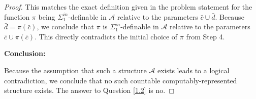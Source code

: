 \begin{proof}
This matches the exact definition given in the problem statement for the function $\pi$ being $\Sigma^{in}_1$-definable in $\mathcal{A}$ relative to the parameters $\bar{c} \cup \bar{d}$. 
Because $\bar{d} = \pi(\bar{c})$, we conclude that $\pi$ is $\Sigma^{in}_1$-definable in $\mathcal{A}$ relative to the parameters $\bar{c} \cup \pi(\bar{c})$. 
This directly contradicts the initial choice of $\pi$ from Step 4. 

\textbf{Conclusion:}

Because the assumption that such a structure $\mathcal{A}$ exists leads to a logical contradiction, we conclude that no such countable computably-represented structure exists. The answer to Question \ref{1.2} is no.
\end{proof}
